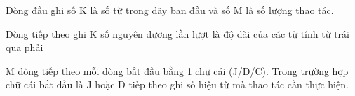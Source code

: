 Dòng đầu ghi số K là số từ trong dãy ban đầu và số M là số lượng thao tác.

Dòng tiếp theo ghi K số nguyên dương lần lượt là độ dài của các từ tính từ trái qua phải

M dòng tiếp theo mỗi dòng bắt đầu bằng 1 chữ cái (J/D/C). Trong trường hợp chữ cái bắt đầu là J hoặc D tiếp theo ghi số hiệu từ mà thao tác cần thực hiện.

\